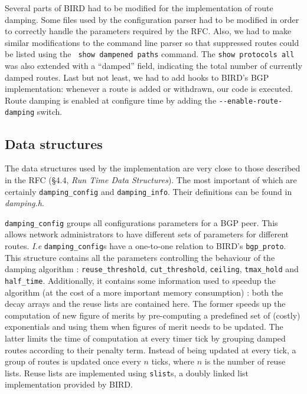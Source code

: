 \documentclass[a4paper,english]{IEEEtran}
\begin{document}
Several parts of BIRD had to be modified for the implementation of route
damping. Some files used by the configuration parser had to be modified 
in order to correctly handle the parameters required by the RFC.
Also, we had to make similar modifications to the command line parser
so that suppressed routes could be listed using the \texttt{\small 
show dampened paths} command.
The \texttt{\small show protocols all} was also extended with a ``damped'' 
field, indicating the total number of currently damped routes.
Last but not least, we had to add hooks to BIRD's BGP implementation:
whenever a route is added or withdrawn, our code is executed.
Route damping is enabled at configure time by adding the 
{\tt\small -{}-enable-route-damping} switch.

\subsection{Data structures}

The data structures used by the implementation are very close to 
those described in the RFC (\S4.4, \textit{Run Time Data Structures}).
The most important of which are certainly {\tt\small damping\_config} and
{\tt\small damping\_info}.
Their definitions can be found in {\sl damping.h}.

{\tt\small damping\_config} groups all configurations parameters for a BGP peer.
This allows network administrators to have different sets of parameters for
different routes. {\it I.e} \texttt{\small damping\_config}s have a 
one-to-one relation to BIRD's \texttt{\small bgp\_proto}.
This structure contains all the parameters controlling the behaviour 
of the damping algorithm :
\texttt{\small reuse\_threshold}, \texttt{\small cut\_threshold}, 
\texttt{\small ceiling}, \texttt{\small tmax\_hold} and \texttt{\small half\_time}.
Additionally, it contains some information used to speedup the algorithm
(at the cost of a more important memory consumption) : both the decay
arrays and the reuse lists are contained here. The former speeds up the
computation of new figure of merits by pre-computing a predefined set
of (costly) exponentials and using them when figures of merit needs to 
be updated.
The latter limits the time of computation at every timer tick by 
grouping damped routes according to their penalty term.
Instead of being updated at every tick, a group of routes is updated 
once every $n$ ticks, where $n$ is the number of reuse lists.
Reuse lists are implemented using \texttt{\small slist}s, 
a doubly linked list implementation provided by BIRD.
\end{document}
